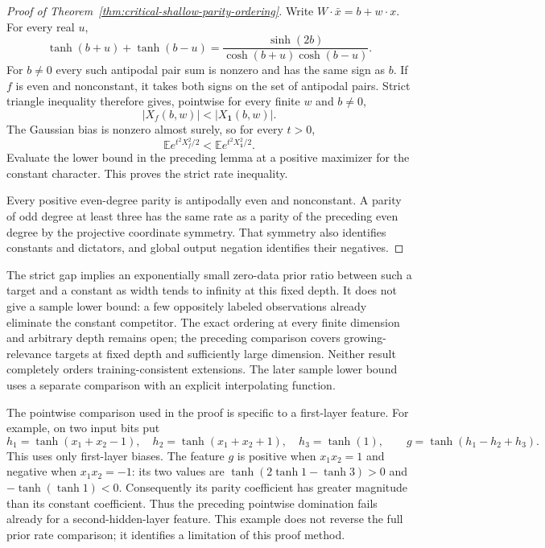 \begin{proof}[Proof of Theorem~\ref{thm:critical-shallow-parity-ordering}]
Write $W\cdot\bar x=b+w\cdot x$. For every real $u$,
\[
 \tanh(b+u)+\tanh(b-u)
 =\frac{\sinh(2b)}{\cosh(b+u)\cosh(b-u)}.
\]
For $b\ne0$ every such antipodal pair sum is nonzero and has the
same sign as $b$. If $f$ is even and nonconstant, it takes both signs
on the set of antipodal pairs. Strict triangle inequality therefore
gives, pointwise for every finite $w$ and $b\ne0$,
\[
 |X_f(b,w)|<|X_{\mathbf1}(b,w)|.
\]
The Gaussian bias is nonzero almost surely, so for every $t>0$,
\[
 \mathbb E e^{t^2X_f^2/2}
 <\mathbb E e^{t^2X_{\mathbf1}^2/2}.
\]
Evaluate the lower bound in the preceding lemma at a positive
maximizer for the constant character. This proves the strict rate
inequality.

Every positive even-degree parity is antipodally even and nonconstant.
A parity of odd degree at least three has the same rate as a parity
of the preceding even degree by the projective coordinate symmetry.
That symmetry also identifies constants and dictators, and global
output negation identifies their negatives.
\end{proof}

The strict gap implies an exponentially small zero-data prior ratio
between such a target and a constant as width tends to infinity at
this fixed depth. It does not give a sample lower bound: a few
oppositely labeled observations already eliminate the constant
competitor. The exact ordering at every finite dimension and arbitrary
depth remains open; the preceding comparison covers growing-relevance
targets at fixed depth and sufficiently large dimension. Neither result
completely orders training-consistent extensions. The later sample lower
bound uses a separate comparison with an explicit interpolating function.

The pointwise comparison used in the proof is specific to a first-layer
feature. For example, on two input bits put
\[
 h_1=\tanh(x_1+x_2-1),\quad
 h_2=\tanh(x_1+x_2+1),\quad h_3=\tanh(1),
 \qquad g=\tanh(h_1-h_2+h_3).
\]
This uses only first-layer biases. The feature $g$ is positive when
$x_1x_2=1$ and negative when $x_1x_2=-1$: its two values are
$\tanh(2\tanh1-\tanh3)>0$ and $-\tanh(\tanh1)<0$.
Consequently its parity coefficient has greater magnitude than its
constant coefficient. Thus the preceding pointwise domination fails
already for a second-hidden-layer feature. This example does not
reverse the full prior rate comparison; it identifies a limitation of
this proof method.
